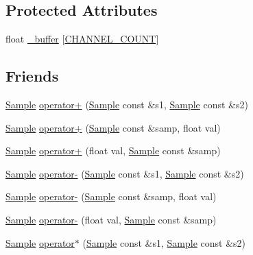 \subsection*{Protected Attributes}
\begin{DoxyCompactItemize}
\item 
float \hyperlink{class_signal_1_1_sample_ad609d308b1c36b007bd8210d316c070b}{\+\_\+buffer} \mbox{[}\hyperlink{_sample_8h_a29e42927003b0aa647ee45965f4ccb07}{C\+H\+A\+N\+N\+E\+L\+\_\+\+C\+O\+U\+N\+T}\mbox{]}
\end{DoxyCompactItemize}
\subsection*{Friends}
\begin{DoxyCompactItemize}
\item 
\hyperlink{class_signal_1_1_sample}{Sample} \hyperlink{class_signal_1_1_sample_a2fd9547bca678d483b7678ff2d19c7bf}{operator+} (\hyperlink{class_signal_1_1_sample}{Sample} const \&s1, \hyperlink{class_signal_1_1_sample}{Sample} const \&s2)
\item 
\hyperlink{class_signal_1_1_sample}{Sample} \hyperlink{class_signal_1_1_sample_a001ec49a9676fe37d9dfbb6f0b27127d}{operator+} (\hyperlink{class_signal_1_1_sample}{Sample} const \&samp, float val)
\item 
\hyperlink{class_signal_1_1_sample}{Sample} \hyperlink{class_signal_1_1_sample_a9a5ae50b9096d1c778d6a676b562e11a}{operator+} (float val, \hyperlink{class_signal_1_1_sample}{Sample} const \&samp)
\item 
\hyperlink{class_signal_1_1_sample}{Sample} \hyperlink{class_signal_1_1_sample_a4539e34cec889979677229c5ddf6eaf1}{operator-\/} (\hyperlink{class_signal_1_1_sample}{Sample} const \&s1, \hyperlink{class_signal_1_1_sample}{Sample} const \&s2)
\item 
\hyperlink{class_signal_1_1_sample}{Sample} \hyperlink{class_signal_1_1_sample_a30c04ca57e9f947cdd68041231676acc}{operator-\/} (\hyperlink{class_signal_1_1_sample}{Sample} const \&samp, float val)
\item 
\hyperlink{class_signal_1_1_sample}{Sample} \hyperlink{class_signal_1_1_sample_a27b97bc41eae03efe5f4157bdc3e42b2}{operator-\/} (float val, \hyperlink{class_signal_1_1_sample}{Sample} const \&samp)
\item 
\hyperlink{class_signal_1_1_sample}{Sample} \hyperlink{class_signal_1_1_sample_ae6e21a0672b773c8ae0537410c48a385}{operator$\ast$} (\hyperlink{class_signal_1_1_sample}{Sample} const \&s1, \hyperlink{class_signal_1_1_sample}{Sample} const \&s2)

\end{DoxyCompactItemize}
